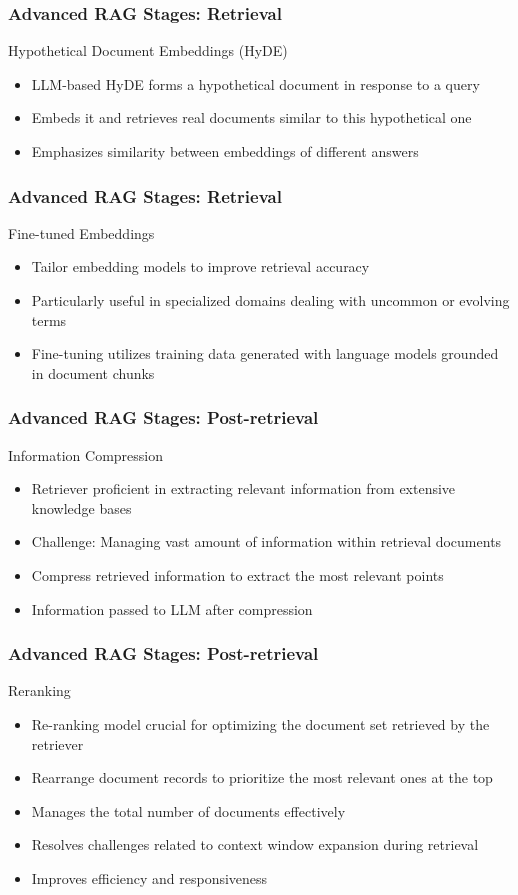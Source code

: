 \begin{frame}[fragile]\frametitle{Advanced RAG Stages: Retrieval}
Hypothetical Document Embeddings (HyDE)
  \begin{itemize}
    \item LLM-based HyDE forms a hypothetical document in response to a query
    \item Embeds it and retrieves real documents similar to this hypothetical one
    \item Emphasizes similarity between embeddings of different answers
  \end{itemize}
\end{frame}

\begin{frame}[fragile]\frametitle{Advanced RAG Stages: Retrieval}
Fine-tuned Embeddings
  \begin{itemize}
    \item Tailor embedding models to improve retrieval accuracy
    \item Particularly useful in specialized domains dealing with uncommon or evolving terms
    \item Fine-tuning utilizes training data generated with language models grounded in document chunks
  \end{itemize}
\end{frame}


\begin{frame}[fragile]\frametitle{Advanced RAG Stages: Post-retrieval}
Information Compression
  \begin{itemize}
    \item Retriever proficient in extracting relevant information from extensive knowledge bases
    \item Challenge: Managing vast amount of information within retrieval documents
    \item Compress retrieved information to extract the most relevant points
    \item Information passed to LLM after compression
  \end{itemize}
\end{frame}

\begin{frame}[fragile]\frametitle{Advanced RAG Stages: Post-retrieval}
Reranking
  \begin{itemize}
    \item Re-ranking model crucial for optimizing the document set retrieved by the retriever
    \item Rearrange document records to prioritize the most relevant ones at the top
    \item Manages the total number of documents effectively
    \item Resolves challenges related to context window expansion during retrieval
    \item Improves efficiency and responsiveness
  \end{itemize}
\end{frame}


